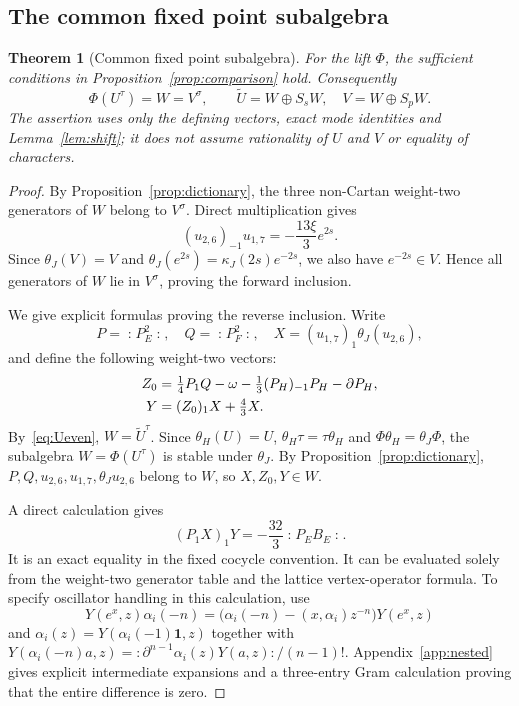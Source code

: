 \documentclass[11pt,reqno]{amsart}
\newtheorem{theorem}{Theorem}[section]
\theoremstyle{definition}\newtheorem{definition}[theorem]{Definition}
\theoremstyle{remark}\newtheorem{remark}[theorem]{Remark}
\newcommand{\one}{\mathbf1}\newcommand{\slc}{\mathfrak{sl}_2}
\newcommand{\nn}[1]{\mathopen{:}#1\mathclose{:}}
\numberwithin{equation}{section}
\begin{document}
\subsection{The common fixed point subalgebra}
\begin{theorem}[Common fixed point subalgebra]\label{thm:fixed}
For the lift $\Phi$, the sufficient conditions in Proposition~\ref{prop:comparison} hold. Consequently
\[
 \Phi(U^\tau)=W=V^\sigma,\qquad
 \widetilde U=W\oplus S_sW,\quad V=W\oplus S_pW.
\]
The assertion uses only the defining vectors, exact mode identities and Lemma~\ref{lem:shift}; it does not assume rationality of $U$ and $V$ or equality of characters.
\end{theorem}
\begin{proof}
By Proposition~\ref{prop:dictionary}, the three non-Cartan weight-two generators of $W$ belong to $V^\sigma$. Direct multiplication gives
\begin{equation}\label{eq:e2s}
 (u_{2,6})_{-1}u_{1,7}=-\frac{13\xi }{3}e^{2s}.
\end{equation}
Since $\theta_J(V)=V$ and $\theta_J(e^{2s})=\kappa_J(2s)e^{-2s}$, we also have $e^{-2s}\in V$. Hence all generators of $W$ lie in $V^\sigma$, proving the forward inclusion.

We give explicit formulas proving the reverse inclusion. Write
\[
 P=\nn{P_E^2},\quad Q=\nn{P_F^2},\quad
 X=(u_{1,7})_{1}\theta_J(u_{2,6}),
\]
and define the following weight-two vectors:
\begin{align}\label{eq:reverseaux}
 Z_0&=\tfrac14P_{1}Q-\omega-\tfrac13(P_H)_{-1}P_H-\partial P_H,\notag\\
 Y&=(Z_0)_{1}X+\tfrac43X.
\end{align}
By~\eqref{eq:Ueven}, $W=\widetilde U^\tau$. Since $\theta_H(U)=U$, $\theta_H\tau=\tau\theta_H$ and $\Phi\theta_H=\theta_J\Phi$, the subalgebra $W=\Phi(U^\tau)$ is stable under $\theta_J$. By Proposition~\ref{prop:dictionary}, $P,Q,u_{2,6},u_{1,7},\theta_Ju_{2,6}$ belong to $W$, so $X,Z_0,Y\in W$.

A direct calculation gives
\begin{equation}\label{eq:PBwitness}
 (P_{1}X)_{1}Y=-\frac{32}{3}\nn{P_EB_E}.
\end{equation}
It is an exact equality in the fixed cocycle convention. It can be evaluated solely from the weight-two generator table and the lattice vertex-operator formula. To specify oscillator handling in this calculation, use
\[
 Y(e^x,z)\alpha_i(-n)=\bigl(\alpha_i(-n)-(x,\alpha_i)z^{-n}\bigr)Y(e^x,z)
\]
and $\alpha_i(z)=Y(\alpha_i(-1)\one,z)$ together with $Y(\alpha_i(-n)a,z)=:\partial^{n-1}\alpha_i(z)Y(a,z):/(n-1)!$. Appendix~\ref{app:nested} gives explicit intermediate expansions and a three-entry Gram calculation proving that the entire difference is zero.


\end{proof}
\end{document}
